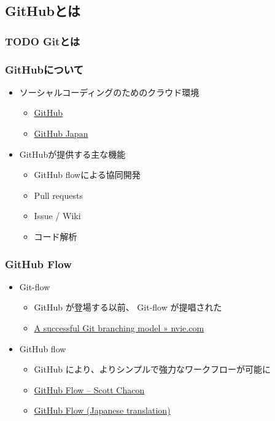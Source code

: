 \documentclass{bxjsarticle}
\begin{document}
\subsection{GitHubとは}
\label{sec-3-2}
\subsubsection{{\bfseries\sffamily TODO} Gitとは}
\label{sec-3-2-1}
\subsubsection{GitHubについて}
\label{sec-3-2-2}
\begin{itemize}
\item ソーシャルコーディングのためのクラウド環境
\begin{itemize}
\item \href{https://github.com/}{GitHub}
\item \href{http://github.co.jp/}{GitHub Japan}
\end{itemize}
\item GitHubが提供する主な機能
\begin{itemize}
\item GitHub flowによる協同開発
\item Pull requests
\item Issue / Wiki
\item コード解析
\end{itemize}
\end{itemize}

\subsubsection{GitHub Flow}
\label{sec-3-2-3}
\begin{itemize}
\item Git-flow
\begin{itemize}
\item GitHub が登場する以前、 Git-flow が提唱された
\item \href{http://nvie.com/posts/a-successful-git-branching-model/}{A successful Git branching model » nvie.com}
\end{itemize}
\item GitHub flow
\begin{itemize}
\item GitHub により、よりシンプルで強力なワークフローが可能に
\item \href{http://scottchacon.com/2011/08/31/github-flow.html}{GitHub Flow – Scott Chacon}
\item \href{https://gist.github.com/Gab-km/3705015}{GitHub Flow (Japanese translation)}
\end{itemize}
\end{itemize}
\end{document}

